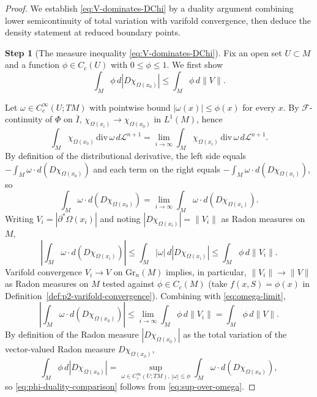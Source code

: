 \begin{proof}
We establish \eqref{eq:V-dominates-DChi} by a duality argument combining lower semicontinuity of total variation with varifold convergence, then deduce the density statement at reduced boundary points.

\medskip\noindent\textbf{Step 1} (The measure inequality \eqref{eq:V-dominates-DChi}).
Fix an open set $U \subset M$ and a function $\phi \in C_c(U)$ with $0 \leq \phi \leq 1$.
We first show
\begin{equation}\label{eq:phi-duality-comparison}
    \int_M \phi\, d|D\chi_{\Omega(x_0)}| \leq \int_M \phi\, d\|V\|.
\end{equation}

Let $\omega \in C^\infty_c(U; TM)$ with pointwise bound $|\omega(x)| \leq \phi(x)$ for every $x$.
By $\mathcal{F}$-continuity of $\Phi$ on $\bar I$, $\chi_{\Omega(x_i)} \to \chi_{\Omega(x_0)}$ in $L^1(M)$, hence
\[
    \int_M \chi_{\Omega(x_0)}\, \mathrm{div}\, \omega\, d\mathcal{L}^{n+1}
    = \lim_{i\to\infty} \int_M \chi_{\Omega(x_i)}\, \mathrm{div}\, \omega\, d\mathcal{L}^{n+1}.
\]
By definition of the distributional derivative, the left side equals $-\int_M \omega\cdot d(D\chi_{\Omega(x_0)})$ and each term on the right equals $-\int_M \omega\cdot d(D\chi_{\Omega(x_i)})$, so
\begin{equation}\label{eq:omega-limit}
    \int_M \omega\cdot d(D\chi_{\Omega(x_0)})
    = \lim_{i\to\infty} \int_M \omega\cdot d(D\chi_{\Omega(x_i)}).
\end{equation}
Writing $V_i = |\partial^*\Omega(x_i)|$ and noting $|D\chi_{\Omega(x_i)}|=\|V_i\|$ as Radon measures on $M$,
\[
    \left|\int_M \omega\cdot d(D\chi_{\Omega(x_i)})\right|
    \leq \int_M |\omega|\, d|D\chi_{\Omega(x_i)}|
    \leq \int_M \phi\, d\|V_i\|.
\]
Varifold convergence $V_i \to V$ on $\mathrm{Gr}_n(M)$ implies, in particular, $\|V_i\|\to\|V\|$ as Radon measures on $M$ tested against $\phi \in C_c(M)$ (take $f(x,S)=\phi(x)$ in Definition~\ref{def:p2-varifold-convergence}). Combining with \eqref{eq:omega-limit},
\begin{equation}\label{eq:sup-over-omega}
    \left|\int_M \omega\cdot d(D\chi_{\Omega(x_0)})\right|
    \leq \lim_{i\to\infty} \int_M \phi\, d\|V_i\|
    = \int_M \phi\, d\|V\|.
\end{equation}
By definition of the Radon measure $|D\chi_{\Omega(x_0)}|$ as the total variation of the vector-valued Radon measure $D\chi_{\Omega(x_0)}$,
\[
    \int_M \phi\, d|D\chi_{\Omega(x_0)}|
    = \sup_{\omega \in C^\infty_c(U;TM),\,|\omega|\leq \phi}
    \int_M \omega\cdot d(D\chi_{\Omega(x_0)}),
\]
so \eqref{eq:phi-duality-comparison} follows from \eqref{eq:sup-over-omega}.


\end{proof}
